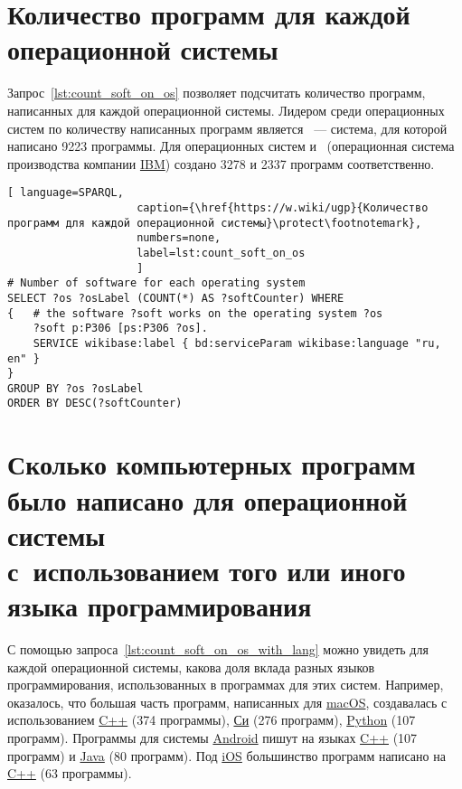 \section{Количество программ для каждой операционной системы}

Запрос~\ref{lst:count_soft_on_os} позволяет подсчитать количество программ, 
написанных для каждой операционной системы.
Лидером среди операционных систем по количеству написанных программ 
    является ~--- система, для которой написано \num{9223} программы. 
    Для операционных систем  и~ 
    (операционная система производства компании \href{https://www.wikidata.org/wiki/Q37156}{IBM}) 
    создано \num{3278} и \num{2337} программ соответственно.


\newpage
\begin{lstlisting}[ language=SPARQL, 
                    caption={\href{https://w.wiki/ugp}{Количество программ для каждой операционной системы}\protect\footnotemark},
                    numbers=none,
                    label=lst:count_soft_on_os
                    ]
# Number of software for each operating system
SELECT ?os ?osLabel (COUNT(*) AS ?softCounter) WHERE
{   # the software ?soft works on the operating system ?os
    ?soft p:P306 [ps:P306 ?os].
    SERVICE wikibase:label { bd:serviceParam wikibase:language "ru, en" }
}
GROUP BY ?os ?osLabel
ORDER BY DESC(?softCounter)
\end{lstlisting}





\section{Сколько компьютерных программ было написано для операционной системы\\
    с~использованием того или иного языка программирования}

С помощью запроса~\ref{lst:count_soft_on_os_with_lang} можно увидеть для каждой операционной системы, 
какова доля вклада разных языков программирования, использованных в программах для этих систем. 
Например, оказалось, что большая часть программ, 
написанных для \href{https://www.wikidata.org/wiki/Q14116}{macOS}, 
создавалась с использованием \href{https://www.wikidata.org/wiki/Q2407}{C++} (374 программы), 
\href{https://www.wikidata.org/wiki/Q15777}{Си} (276 программ), 
\href{https://www.wikidata.org/wiki/Q28865}{Python} (107 программ).
Программы для системы \href{https://www.wikidata.org/wiki/Q94}{Android} пишут 
на языках \href{https://www.wikidata.org/wiki/Q2407}{C++} (107 программ) 
и \href{https://www.wikidata.org/wiki/Q251}{Java} (80 программ).
Под \href{https://www.wikidata.org/wiki/Q48493}{iOS} большинство программ 
написано на \href{https://www.wikidata.org/wiki/Q2407}{C++} (63 программы).

